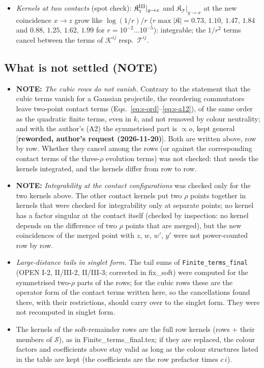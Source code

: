 \documentclass[9pt]{article}
\numberwithin{equation}{section}
\begin{document}
{\begin{itemize}
\item \emph{Kernels at two contacts} (spot check): $\mathfrak{K}^{\rm III}_{z}|_{y\to x}$ and $\mathfrak{K}_{\mathcal{T}}|_{y\to x}$ at the new coincidence $x\to z$ grow like $\log(1/r)/r$ ($r\max|\mathfrak{K}|=0.73,\,1.10,\,1.47,\,1.84$ and $0.88,\,1.25,\,1.62,\,1.99$ for $r=10^{-2}\dots10^{-5}$): integrable; the $1/r^{2}$ terms cancel between the terms of $\mathcal{K}^{ij}$ resp.\ $\mathcal{T}^{ij}$.
\end{itemize}

\subsection{What is not settled (NOTE)}
\begin{itemize}
\item[(1)] \textbf{NOTE:} \emph{The cubic rows do not vanish.} Contrary to the statement that the cubic terms vanish for a Gaussian projectile, the reordering commutators leave two-point contact terms (Eqs.~\eqref{eq:s-ord}--\eqref{eq:s-a12}), of the same order as the quadratic finite terms, even in $k$, and not removed by colour neutrality; and with the author's (A2) the symmetrised part is $\propto o$, kept general [\textbf{reworded, author's request (2026-11-20)}]. Both are written above, row by row. Whether they cancel among the rows (or against the corresponding contact terms of the three-$\rho$ evolution terms) was not checked: that needs the kernels integrated, and the kernels differ from row to row.
\item[(2)] \textbf{NOTE:} \emph{Integrability at the contact configurations} was checked only for the two kernels above. The other contact kernels put two $\rho$ points together in kernels that were checked for integrability only at separate points; no kernel has a factor singular at the contact itself (checked by inspection: no kernel depends on the difference of two $\rho$ points that are merged), but the new coincidences of the merged point with $z$, $w$, $w'$, $y'$ were not power-counted row by row.
\item[(3)] \emph{Large-distance tails in singlet form.} The tail sums of \texttt{Finite\_terms\_final} (OPEN I-2, II/III-2, II/III-3; corrected in fix\_soft) were computed for the symmetrised two-$\rho$ parts of the rows; for the cubic rows these are the operator form of the contact terms written here, so the cancellations found there, with their restrictions, should carry over to the singlet form. They were not recomputed in singlet form.
\item[(4)] The kernels of the soft-remainder rows are the full row kernels (rows $+$ their members of $\mathcal{S}$), as in Finite\_terms\_final.tex; if they are replaced, the colour factors and coefficients above stay valid as long as the colour structures listed in the table are kept (the coefficients are the row prefactor times $c\,i$).

\end{itemize}}
\end{document}
